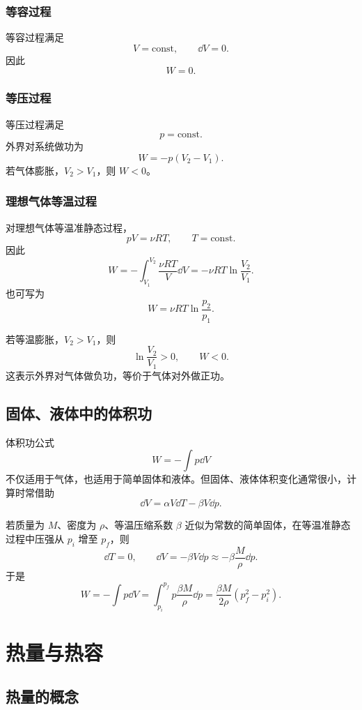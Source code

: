 \subsubsection{等容过程}

等容过程满足
\[
  V=\mathrm{const},
  \qquad
  \dd V=0.
\]
因此
\[
  \boxed{W=0}.
\]

\subsubsection{等压过程}

等压过程满足
\[
  p=\mathrm{const}.
\]
外界对系统做功为
\[
  \boxed{
  W=-p(V_2-V_1)
  }.
\]
若气体膨胀，\(V_2>V_1\)，则 \(W<0\)。

\subsubsection{理想气体等温过程}

对理想气体等温准静态过程，
\[
  pV=\nu RT,
  \qquad
  T=\mathrm{const}.
\]
因此
\[
  W
  =
  -\int_{V_1}^{V_2}\frac{\nu RT}{V}\dd V
  =
  \boxed{
  -\nu RT\ln\frac{V_2}{V_1}
  }.
\]
也可写为
\[
  W=\nu RT\ln\frac{p_2}{p_1}.
\]

\begin{WarnBox}[等温功的符号]
若等温膨胀，\(V_2>V_1\)，则
\[
  \ln\frac{V_2}{V_1}>0,\qquad W<0.
\]
这表示外界对气体做负功，等价于气体对外做正功。
\end{WarnBox}

\subsection{固体、液体中的体积功}

体积功公式
\[
  W=-\int p\dd V
\]
不仅适用于气体，也适用于简单固体和液体。但固体、液体体积变化通常很小，计算时常借助
\[
  \dd V=\alpha V\dd T-\beta V\dd p.
\]

若质量为 \(M\)、密度为 \(\rho\)、等温压缩系数 \(\beta\) 近似为常数的简单固体，在等温准静态过程中压强从 \(p_i\) 增至 \(p_f\)，则
\[
  \dd T=0,\qquad
  \dd V=-\beta V\dd p\approx-\beta\frac{M}{\rho}\dd p.
\]
于是
\[
  W=-\int p\dd V
  =
  \int_{p_i}^{p_f}p\frac{\beta M}{\rho}\dd p
  =
  \boxed{
  \frac{\beta M}{2\rho}(p_f^2-p_i^2)
  }.
\]

\section{热量与热容}

\subsection{热量的概念}

